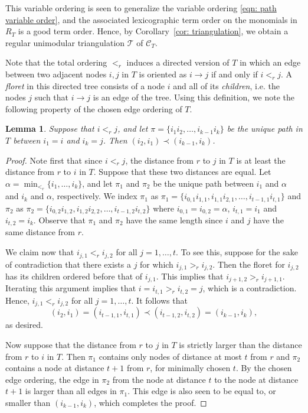 \documentclass[11pt]{article}
\newtheorem{lemm}[theo]{Lemma}
\theoremstyle{definition}
\numberwithin{equation}{section}
\begin{document}
This variable ordering is seen to generalize the variable ordering \eqref{eqn: path variable order}, and the associated lexicographic term order on the monomials in $R_T$ is a good term order. 
Hence, by Corollary~\ref{cor: triangulation}, we obtain a regular unimodular triangulation $\mathcal{T}$ of $\mathcal{C}_T$. 

Note that the total ordering $<_r$ induces a directed version of $T$ in which an edge between two adjacent nodes $i, j$ in $T$ is oriented as $i\rightarrow j$ if and only if $i <_r j$. 
A \emph{floret} in this directed tree consists of a node $i$ and all of its \emph{children}, i.e. the nodes $j$ such that $i\rightarrow j$ is an edge of the tree. 
Using this definition, we note the following property of the chosen edge ordering of $T$.
\begin{lemm}
    \label{lem: largest edge}
    Suppose that $i <_r j$, and let $\pi = \{i_1i_2,\ldots, i_{k-1}i_k\}$ be the unique path in $T$ between $i_1 = i$ and $i_k = j$. 
    Then $(i_2,i_1) \prec (i_{k-1},i_k)$.  
\end{lemm}

\begin{proof}
Note first that since $i <_r j$, the distance from $r$ to $j$ in $T$ is at least the distance from $r$ to $i$ in $T$.  
Suppose that these two distances are equal.  
Let $\alpha = \min_{<_r}\{i_1,\ldots, i_k\}$, and let $\pi_1$ and $\pi_2$ be the unique path between $i_1$ and $\alpha$ and $i_k$ and $\alpha$, respectively.  
We index $\pi_1$ as $\pi_1 = \{i_{0,1}i_{1,1}, i_{1,1}i_{2,1},\ldots, i_{t-1,1}i_{t,1}\}$ and $\pi_2$ as $\pi_2 = \{i_{0,2}i_{1,2}, i_{1,2}i_{2,2},\ldots, i_{t-1,2}i_{t,2}\}$ where $i_{0,1} = i_{0,2} = \alpha$, $i_{t,1} = i_1$ and $i_{t,2} = i_k$. 
Observe that $\pi_1$ and $\pi_2$ have the same length since $i$ and $j$ have the same distance from $r$.  

We claim now that $i_{j,1} <_r i_{j,2}$ for all $j = 1,\ldots, t$.  
To see this, suppose for the sake of contradiction that there exists a $j$ for which $i_{j,1} >_r i_{j,2}$.  
Then the floret for $i_{j,2}$ has its children ordered before that of $i_{j,1}$.  
This implies that $i_{j+1,2} >_r i_{j+1,1}$.
Iterating this argument implies that $i = i_{t,1} >_r i_{t,2} = j$, which is a contradiction.  
Hence, $i_{j,1} <_r i_{j,2}$ for all $j = 1,\ldots, t$.  
It follows that
\[
(i_2, i_1) = (i_{t-1,1}, i_{t,1}) \prec (i_{t-1,2}, i_{t,2}) = (i_{k-1}, i_k), 
\]
as desired. 

Now suppose that the distance from $r$ to $j$ in $T$ is strictly larger than the distance from $r$ to $i$ in $T$. 
Then $\pi_1$ contains only nodes of distance at most $t$ from $r$ and $\pi_2$ contains a node at distance $t+1$ from $r$, for minimally chosen $t$.  
By the chosen edge ordering, the edge in $\pi_2$ from the node at distance $t$ to the node at distance $t+1$ is larger than all edges in $\pi_1$.  This edge is also seen to be equal to, or smaller than $(i_{k-1},i_k)$, which completes the proof. 
\end{proof}
\end{document}
